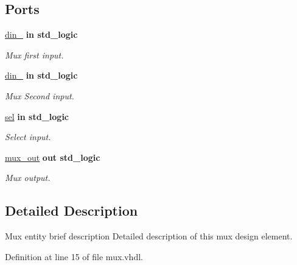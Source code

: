 \subsection*{Ports}
 \begin{DoxyCompactItemize}
\item 
\mbox{\hyperlink{classmux__using__with_a6b6ddbcf5e151609729ea3dc550a0602}{din\+\_}}  {\bfseries {\bfseries \textcolor{keywordflow}{in}\textcolor{vhdlchar}{ }}} {\bfseries \textcolor{keywordtype}{std\+\_\+logic}\textcolor{vhdlchar}{ }} 
\begin{DoxyCompactList}\small\item\em Mux first input. \end{DoxyCompactList}\item 
\mbox{\hyperlink{classmux__using__with_ac132057a1a8271508f59556da8a85fb0}{din\+\_}}  {\bfseries {\bfseries \textcolor{keywordflow}{in}\textcolor{vhdlchar}{ }}} {\bfseries \textcolor{keywordtype}{std\+\_\+logic}\textcolor{vhdlchar}{ }} 
\begin{DoxyCompactList}\small\item\em Mux Second input. \end{DoxyCompactList}\item 
\mbox{\hyperlink{classmux__using__with_a00d652a26316e86f236042f42bcc035d}{sel}}  {\bfseries {\bfseries \textcolor{keywordflow}{in}\textcolor{vhdlchar}{ }}} {\bfseries \textcolor{keywordtype}{std\+\_\+logic}\textcolor{vhdlchar}{ }} 
\begin{DoxyCompactList}\small\item\em Select input. \end{DoxyCompactList}\item 
\mbox{\hyperlink{classmux__using__with_ab93734a6ea826ed134ddfc695b3a04b4}{mux\+\_\+out}}  {\bfseries {\bfseries \textcolor{keywordflow}{out}\textcolor{vhdlchar}{ }}} {\bfseries \textcolor{keywordtype}{std\+\_\+logic}\textcolor{vhdlchar}{ }} 
\begin{DoxyCompactList}\small\item\em Mux output. \end{DoxyCompactList}\end{DoxyCompactItemize}


\subsection{Detailed Description}
Mux entity brief description Detailed description of this mux design element. 

Definition at line 15 of file mux.\+vhdl.



